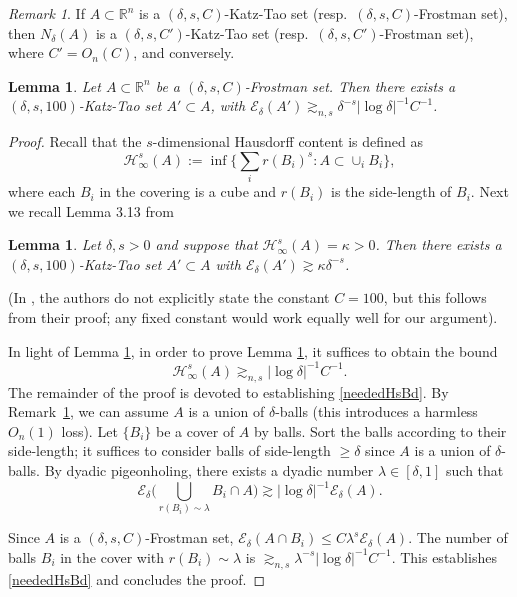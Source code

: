 \documentclass[letterpaper, reqno,11pt]{article}
\numberwithin{equation}{section}
\newcommand{\RR}{\mathbb{R}}
\numberwithin{thm}{section}
\newtheorem{lem}[thm]{Lemma}
\theoremstyle{remark}
\newtheorem{rem}[thm]{Remark}
\begin{document}
\begin{rem}\label{rem: delta thick}
If $A\subset\RR^n$ is a $(\delta, s, C)$-Katz-Tao set (resp.~$(\delta,s, C)$-Frostman set), then $N_{\delta}(A)$ is a $(\delta, s, C')$-Katz-Tao set (resp.~$(\delta,s, C')$-Frostman set), where $C'=O_n(C)$, and conversely.
\end{rem}
\begin{lem}\label{lem: Katz-Tao}
Let $A\subset \RR^n$ be a $(\delta, s,C)$-Frostman set. Then there exists a $(\delta, s, 100)$-Katz-Tao set $A'\subset A$, with  $\mathcal{E}_{\delta}(A') \gtrsim_{n,s} \delta^{-s}  |\log \delta|^{-1} C^{-1}$. 
\end{lem}
\begin{proof}
%
Recall that the $s$-dimensional Hausdorff content  is defined as 
\[
\mathcal{H}^s_{\infty}(A):=\inf\Big\{\sum_i r(B_i)^s: A\subset \cup_i B_i\Big\},
\]
where each $B_i$ in the covering is a cube and $r(B_i)$ is the side-length of $B_i$.  Next we recall Lemma 3.13 from \cite{FasslerOrponen}
\begin{lem}\label{FOLemma}
Let $\delta,s>0$ and suppose that $\mathcal{H}^s_{\infty}(A)=\kappa>0$. Then there exists a $(\delta,s,100)$-Katz-Tao set $A'\subset A$ with $\mathcal{E}_{\delta}(A')\gtrsim \kappa \delta^{-s}$.
\end{lem}
(In \cite{FasslerOrponen}, the authors do not explicitly state the constant $C=100$, but this follows from their proof; any fixed constant would work equally well for our argument). 

In light of Lemma \ref{FOLemma}, in order to prove Lemma \ref{lem: Katz-Tao}, it suffices to obtain the bound
\begin{equation}\label{neededHsBd}
\mathcal{H}^s_{\infty}(A) \gtrsim_{n,s} |\log \delta|^{-1} C^{-1}.
\end{equation}
The remainder of the proof is devoted to establishing \eqref{neededHsBd}. By Remark~\ref{rem: delta thick}, we can assume $A$ is a union of $\delta$-balls (this introduces a harmless $O_n(1)$ loss). Let $\{B_i\}$ be a cover of $A$ by balls. Sort the balls according to their side-length; it suffices to consider balls of side-length $\geq \delta$ since $A$ is a union of $\delta$-balls. By dyadic pigeonholing, there exists a  dyadic number $\lambda\in [\delta, 1]$ such that
\[
\mathcal{E}_{\delta} \Big(\bigcup_{r(B_i)\sim \lambda}  B_i \cap A\Big) \gtrsim |\log \delta|^{-1} \mathcal{E}_{\delta}(A).
\]

 Since $A$ is a $(\delta,s, C)$-Frostman set, $\mathcal{E}_{\delta}(A\cap B_i) \leq C \lambda^{s} \mathcal{E}_{\delta}(A)$. The number of balls $B_i$ in the cover with $r(B_i) \sim \lambda $ is $\gtrsim_{n,s} \lambda^{-s} |\log \delta|^{-1}C^{-1}$. This establishes \eqref{neededHsBd} and concludes the proof. 
\end{proof}
\end{document}
